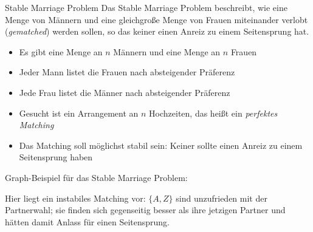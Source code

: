 \documentclass{panikzettel}
\begin{document}
\begin{halfboxl}
	\vspace{-\baselineskip}
	\begin{defi}{Stable Marriage Problem}
	Das Stable Marriage Problem beschreibt, wie eine Menge von Männern und eine gleichgroße Menge von Frauen miteinander verlobt (\emph{gematched}) werden sollen, so das keiner einen Anreiz zu einem Seitensprung hat.\\
	
	\begin{itemize}
		\item Es gibt eine Menge an $n$ Männern und eine Menge an $n$ Frauen
		\item Jeder Mann listet die Frauen nach absteigender Präferenz
		\item Jede Frau listet die Männer nach absteigender Präferenz
		\item Gesucht ist ein Arrangement an $n$ Hochzeiten, das heißt ein \emph{perfektes Matching}
		\item Das Matching soll möglichst stabil sein: Keiner sollte einen Anreiz zu einem Seitensprung haben
	\end{itemize}
	\end{defi}
\end{halfboxl}%
\begin{halfboxr}
	 \vspace{-\baselineskip}
	Graph-Beispiel für das Stable Marriage Problem:\\
	
	\begin{center}
	
	Hier liegt ein instabiles Matching vor: $\{A,Z\}$ sind unzufrieden mit der Partnerwahl; sie finden sich gegenseitig besser als ihre jetzigen Partner und hätten damit Anlass für einen Seitensprung.
	\end{center}
\end{halfboxr}
\end{document}

